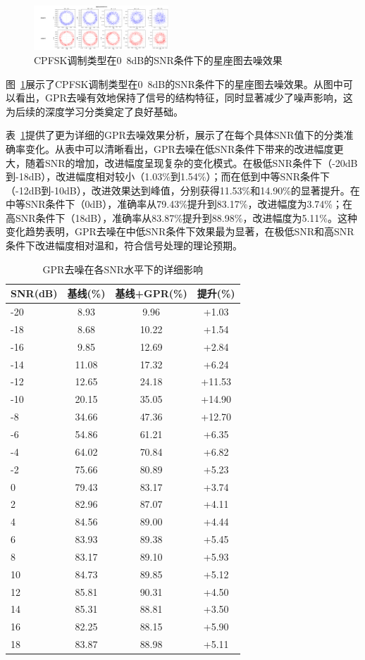 \documentclass[conference]{IEEEtran}
\begin{document}
\begin{figure}[htbp]
\centering
\includegraphics[width=0.45\textwidth]{figure/constellation_denoising.png}
\caption{CPFSK调制类型在0~8dB的SNR条件下的星座图去噪效果}
\label{fig:constellation_denoising}
\end{figure}


图~\ref{fig:constellation_denoising}展示了CPFSK调制类型在0~8dB的SNR条件下的星座图去噪效果。从图中可以看出，GPR去噪有效地保持了信号的结构特征，同时显著减少了噪声影响，这为后续的深度学习分类奠定了良好基础。


表~\ref{tab:gpr_detailed_snr}提供了更为详细的GPR去噪效果分析，展示了在每个具体SNR值下的分类准确率变化。从表中可以清晰看出，GPR去噪在低SNR条件下带来的改进幅度更大，随着SNR的增加，改进幅度呈现复杂的变化模式。在极低SNR条件下（-20dB到-18dB），改进幅度相对较小（1.03\%到1.54\%）；而在低到中等SNR条件下（-12dB到-10dB），改进效果达到峰值，分别获得11.53\%和14.90\%的显著提升。在中等SNR条件下（0dB），准确率从79.43\%提升到83.17\%，改进幅度为3.74\%；在高SNR条件下（18dB），准确率从83.87\%提升到88.98\%，改进幅度为5.11\%。这种变化趋势表明，GPR去噪在中低SNR条件下效果最为显著，在极低SNR和高SNR条件下改进幅度相对温和，符合信号处理的理论预期。

\begin{table}[h]
\centering
\caption{GPR去噪在各SNR水平下的详细影响}
\label{tab:gpr_detailed_snr}
\begin{tabular}{@{}lccc@{}}
\toprule
SNR(dB) & 基线(\%) & 基线+GPR(\%) & 提升(\%) \\
\midrule
-20 & 8.93 & 9.96 & +1.03 \\
-18 & 8.68 & 10.22 & +1.54 \\
-16 & 9.85 & 12.69 & +2.84 \\
-14 & 11.08 & 17.32 & +6.24 \\
-12 & 12.65 & 24.18 & +11.53 \\
-10 & 20.15 & 35.05 & +14.90 \\
-8 & 34.66 & 47.36 & +12.70 \\
-6 & 54.86 & 61.21 & +6.35 \\
-4 & 64.02 & 70.84 & +6.82 \\
-2 & 75.66 & 80.89 & +5.23 \\
0 & 79.43 & 83.17 & +3.74 \\
2 & 82.96 & 87.07 & +4.11 \\
4 & 84.56 & 89.00 & +4.44 \\
6 & 83.93 & 89.38 & +5.45 \\
8 & 83.17 & 89.10 & +5.93 \\
10 & 84.73 & 89.85 & +5.12 \\
12 & 85.81 & 90.31 & +4.50 \\
14 & 85.31 & 88.81 & +3.50 \\
16 & 82.25 & 88.15 & +5.90 \\
18 & 83.87 & 88.98 & +5.11 \\
\bottomrule
\end{tabular}
\end{table}
\end{document}
